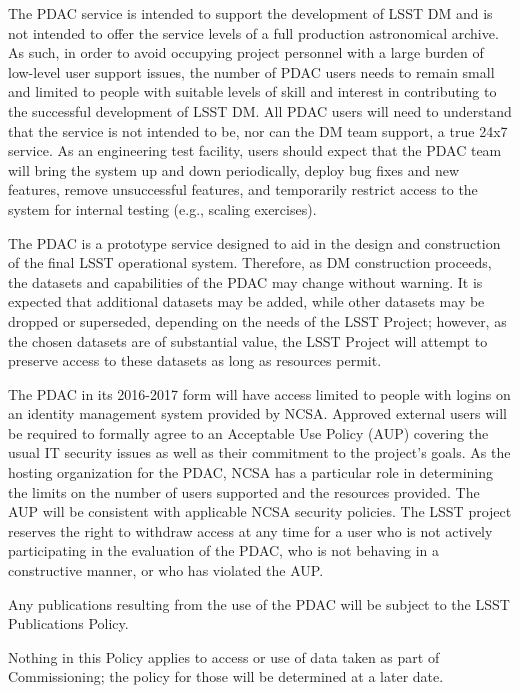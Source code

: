 \documentclass[DM,lsstdraft,toc]{lsstdoc}
\begin{document}
The PDAC service is intended to support the development of LSST DM and is not intended to offer the service levels of a full production astronomical archive. As such, in order to avoid occupying project personnel with a large burden of low-level user support issues, the number of PDAC users needs to remain small and limited to people with suitable levels of skill and interest in contributing to the successful development of LSST DM. All PDAC users will need to understand that the service is not intended to be, nor can the DM team support, a true 24x7 service. As an engineering test facility, users should expect that the PDAC team will bring the system up and down periodically, deploy bug fixes and new features, remove unsuccessful features, and temporarily restrict access to the system for internal testing (e.g., scaling exercises).

The PDAC is a prototype service designed to aid in the design and construction of the final LSST operational system. Therefore, as DM construction proceeds, the datasets and capabilities of the PDAC may change without warning. It is expected that additional datasets may be added, while other datasets may be dropped or superseded, depending on the needs of the LSST Project; however, as the chosen datasets are of substantial value, the LSST Project will attempt to preserve access to these datasets as long as resources permit.

The PDAC in its 2016-2017 form will have access limited to people with logins on an identity management system provided by NCSA. Approved external users will be required to formally agree to an Acceptable Use Policy (AUP) covering the usual IT security issues as well as their commitment to the project's goals. As the hosting organization for the PDAC, NCSA has a particular role in determining the limits on the number of users supported and the resources provided. The AUP will be consistent with applicable NCSA security policies. The LSST project reserves the right to withdraw access at any time for a user who is not actively participating in the evaluation of the PDAC, who is not behaving in a constructive manner, or who has violated the AUP.

Any publications resulting from the use of the PDAC will be subject to the LSST Publications Policy.

Nothing in this Policy applies to access or use of data taken as part of Commissioning; the policy for those will be determined at a later date.
\end{document}
